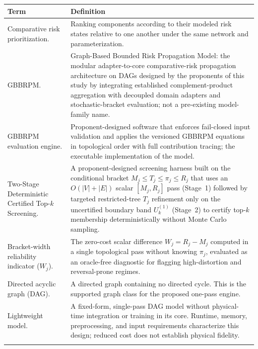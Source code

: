 {\small\renewcommand{\arraystretch}{1.08}
\begin{longtable}{@{}p{}p{}@{}}
\toprule
Term & Definition \\
\midrule
\endhead
\bottomrule
\endlastfoot
 
Comparative risk prioritization. &
Ranking components according to their modeled risk states relative to one another under the same network and parameterization. \\
\addlinespace
 
GBBRPM. &
Graph-Based Bounded Risk Propagation Model: the modular adapter-to-core comparative-risk propagation architecture on DAGs designed by the proponents of this study by integrating established complement-product aggregation with decoupled domain adapters and stochastic-bracket evaluation; not a pre-existing model-family name. \\
\addlinespace
 
GBBRPM evaluation engine. &
Proponent-designed software that enforces fail-closed input validation and applies the versioned GBBRPM equations in topological order with full contribution tracing; the executable implementation of the model. \\
\addlinespace

Two-Stage Deterministic Certified Top-$k$ Screening. &
A proponent-designed screening harness built on the conditional bracket $M_j \le T_j \le \pi_j \le R_j$ that uses an $O(|V|+|E|)$ scalar $[M_j, R_j]$ pass (Stage~1) followed by targeted restricted-tree $T_j$ refinement only on the uncertified boundary band $U_k^{(1)}$ (Stage~2) to certify top-$k$ membership deterministically without Monte Carlo sampling. \\
\addlinespace

Bracket-width reliability indicator ($W_j$). &
The zero-cost scalar difference $W_j = R_j - M_j$ computed in a single topological pass without knowing $\pi_j$, evaluated as an oracle-free diagnostic for flagging high-distortion and reversal-prone regimes. \\
\addlinespace

Directed acyclic graph (DAG). &
A directed graph containing no directed cycle. This is the supported graph class for the proposed one-pass engine. \\
\addlinespace

Lightweight model. &
A fixed-form, single-pass DAG model without physical-time integration or training in its core. Runtime, memory, preprocessing, and input requirements characterize this design; reduced cost does not establish physical fidelity. \\
\addlinespace


\end{longtable}}
